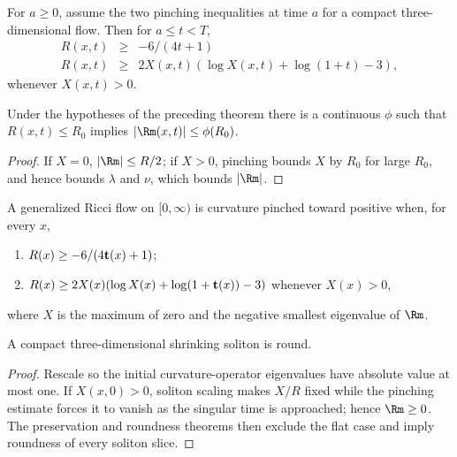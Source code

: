 \begin{theorem}
\label{thm:pinching-persists-from-time-a}
\label{pincha}
For $a\ge0$, assume the two pinching inequalities at time $a$ for a compact
three-dimensional flow. Then for $a\le t<T$,
\begin{eqnarray}\label{Rlower}
R(x,t)&\ge&-6/(4t+1)\\\label{RXineq}
R(x,t)&\ge&2X(x,t)(\log X(x,t)+\log(1+t)-3),
\end{eqnarray}
whenever $X(x,t)>0$.
\end{theorem}

\begin{corollary}
\label{cor:curvature-bound-from-scalar-pinching}

Under the hypotheses of the preceding theorem there is a continuous $\phi$
such that $R(x,t)\le R_0$ implies $|\Rm(x,t)|\le\phi(R_0)$.
\end{corollary}
\begin{proof}
\sketch If $X=0$, $|\Rm|\le R/2$; if $X>0$, pinching bounds $X$ by $R_0$
for large $R_0$, and hence bounds $\lambda$ and $\nu$, which bounds $|\Rm|$.
\end{proof}

\begin{definition}
\label{def:curvature-pinched-toward-positive}
\label{pinchd}
A generalized Ricci flow on $[0,\infty)$ is curvature pinched toward positive
when, for every $x$,
\begin{enumerate}
\item $R(x)\ge-6/(4{\bf t}(x)+1)$;
\item $R(x)\ge2X(x)(\log X(x)+\log(1+{\bf t}(x))-3)$ whenever $X(x)>0$,
\end{enumerate}
where $X$ is the maximum of zero and the negative smallest eigenvalue of
$\Rm$.
\end{definition}

\begin{theorem}
\label{thm:shrinking-soliton-round}
A compact three-dimensional shrinking soliton is round.
\end{theorem}
\begin{proof}
\sketch Rescale so the initial curvature-operator eigenvalues have absolute
value at most one. If $X(x,0)>0$, soliton scaling makes $X/R$ fixed while
the pinching estimate forces it to vanish as the singular time is approached;
hence $\Rm\ge0$. The preservation and roundness theorems then exclude the
flat case and imply roundness of every soliton slice.
\end{proof}

